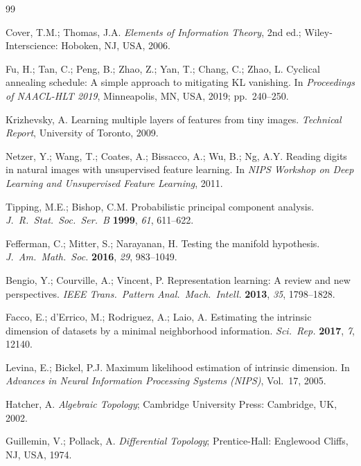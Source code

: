 \documentclass[11pt,a4paper]{article}
\begin{document}
\begin{thebibliography}{99}

Cover, T.M.; Thomas, J.A.
\textit{Elements of Information Theory}, 2nd ed.;
Wiley-Interscience: Hoboken, NJ, USA, 2006.

Fu, H.; Tan, C.; Peng, B.; Zhao, Z.; Yan, T.; Chang, C.; Zhao, L.
Cyclical annealing schedule: A simple approach to mitigating {KL} vanishing.
In \textit{Proceedings of NAACL-HLT 2019}, Minneapolis, MN, USA, 2019; pp.~240--250.

Krizhevsky, A.
Learning multiple layers of features from tiny images.
\textit{Technical Report}, University of Toronto, 2009.

Netzer, Y.; Wang, T.; Coates, A.; Bissacco, A.; Wu, B.; Ng, A.Y.
Reading digits in natural images with unsupervised feature learning.
In \textit{NIPS Workshop on Deep Learning and Unsupervised Feature Learning}, 2011.

Tipping, M.E.; Bishop, C.M.
Probabilistic principal component analysis.
\textit{J.~R.~Stat.~Soc.\ Ser.\ B} \textbf{1999}, \textit{61}, 611--622.

Fefferman, C.; Mitter, S.; Narayanan, H.
Testing the manifold hypothesis.
\textit{J.~Am.~Math.~Soc.} \textbf{2016}, \textit{29}, 983--1049.

Bengio, Y.; Courville, A.; Vincent, P.
Representation learning: A review and new perspectives.
\textit{IEEE Trans.~Pattern Anal.~Mach.~Intell.} \textbf{2013}, \textit{35}, 1798--1828.

Facco, E.; d'Errico, M.; Rodriguez, A.; Laio, A.
Estimating the intrinsic dimension of datasets by a minimal neighborhood information.
\textit{Sci.~Rep.} \textbf{2017}, \textit{7}, 12140.

Levina, E.; Bickel, P.J.
Maximum likelihood estimation of intrinsic dimension.
In \textit{Advances in Neural Information Processing Systems (NIPS)}, Vol.~17, 2005.

Hatcher, A. \textit{Algebraic Topology};
Cambridge University Press: Cambridge, UK, 2002.

Guillemin, V.; Pollack, A. \textit{Differential Topology};
Prentice-Hall: Englewood Cliffs, NJ, USA, 1974.


\end{thebibliography}
\end{document}
